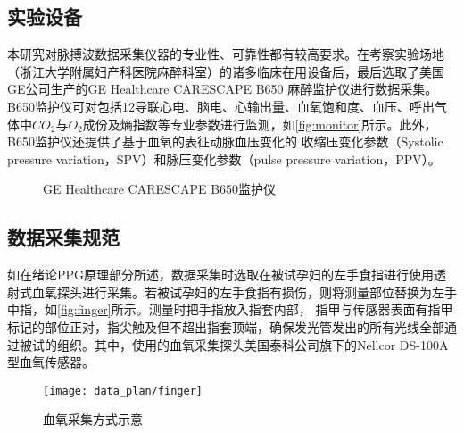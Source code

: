 \subsection{实验设备}
本研究对脉搏波数据采集仪器的专业性、可靠性都有较高要求。在考察实验场地（浙江大学附属妇产科医院麻醉科室）的诸多临床在用设备后，最后选取了美国GE公司生产的GE Healthcare CARESCAPE B650 麻醉监护仪进行数据采集。
B650监护仪可对包括12导联心电、脑电、心输出量、血氧饱和度、血压、呼出气体中$CO_{2}$与$O_{2}$成份及熵指数等专业参数进行监测，如\autoref{fig:monitor}所示。此外，B650监护仪还提供了基于血氧的表征动脉血压变化的
收缩压变化参数（Systolic pressure variation，SPV）和脉压变化参数（pulse pressure variation，PPV）\cite{GE2021,Michard1999}。
\begin{figure}[htbp]
      \centering
      \quad
      \caption{\label{fig:monitor}GE Healthcare CARESCAPE B650监护仪}
\end{figure}

\subsection{数据采集规范}
如在绪论PPG原理部分所述，数据采集时选取在被试孕妇的左手食指进行使用透射式血氧探头进行采集。若被试孕妇的左手食指有损伤，则将测量部位替换为左手中指，如\autoref{fig:finger}所示。测量时把手指放入指套内部，
指甲与传感器表面有指甲标记的部位正对，指尖触及但不超出指套顶端，确保发光管发出的所有光线全部通过被试的组织。其中，使用的血氧采集探头美国泰科公司旗下的Nellcor DS-100A型血氧传感器。 
\begin{figure}[htbp]
      \centering
      \texttt{[image: data\_plan/finger]}
      \caption{\label{fig:finger}血氧采集方式示意}
\end{figure}
